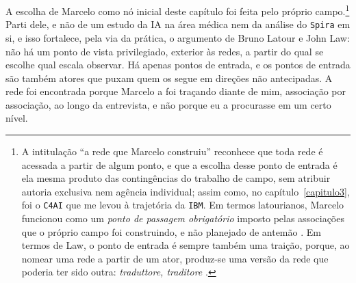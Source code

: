 A escolha de Marcelo como nó inicial deste capítulo foi feita pelo próprio campo.\footnote{A intitulação
\enquote{a rede que Marcelo construiu} reconhece que toda rede é acessada a partir de algum ponto, e que a escolha desse ponto de entrada é ela mesma produto das contingências do trabalho de campo, sem atribuir autoria exclusiva nem agência individual; assim como, no capítulo~\ref{capitulo3}, foi o \texttt{C4AI} que me levou à trajetória da \texttt{IBM}. Em termos latourianos, Marcelo funcionou como um \textit{ponto de passagem obrigatório} imposto pelas associações que o próprio campo foi construindo, e não planejado de antemão \parencite{Latour2011CienciaEmAcao}. Em termos de Law, o ponto de entrada é sempre também uma traição, porque, ao nomear uma rede a partir de um ator, produz-se uma versão da rede que poderia ter sido outra: \textit{traduttore, traditore} \parencite[p.~5]{Law1999Actor}.} Parti dele, e não de um estudo da IA na área médica nem da análise do \texttt{Spira} em si, e isso fortalece, pela via da prática, o argumento de Bruno Latour e John Law: não há um ponto de vista privilegiado, exterior às redes, a partir do qual se escolhe qual escala observar. Há apenas pontos de entrada, e os pontos de entrada são também atores que puxam quem os segue em direções não antecipadas. A rede foi encontrada porque Marcelo a foi traçando diante de mim, associação por associação, ao longo da entrevista, e não porque eu a procurasse em um certo nível.

